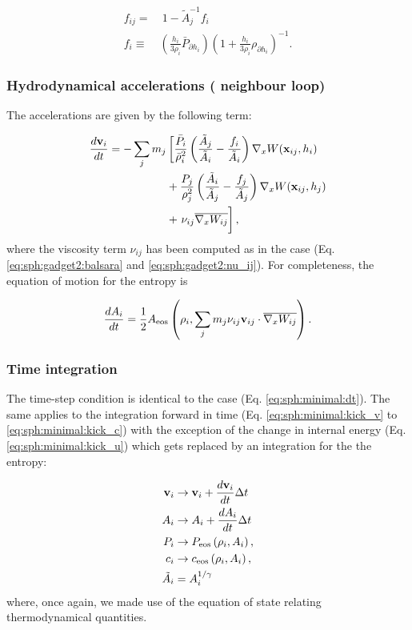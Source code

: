 \begin{align}
    f_{ij} = & ~ 1 - \tilde{A}_j^{-1} f_i \nonumber \\
    f_i \equiv &  \left(\frac{h_i}{3\rho_i}\bar P_{\partial
    h_i}\right)\left(1 + \frac{h_i}{3\rho_i}\rho_{\partial
    h_i}\right)^{-1}. 
\end{align}

\subsubsection{Hydrodynamical accelerations ( neighbour loop)}

The accelerations are given by the following term:

\begin{align}
  \frac{d\vec{v}_i}{dt} = -\sum_j m_j &\left[\frac{\bar P_i}{\bar\rho_i^2} \left(\frac{\tilde A_j}{\tilde A_i} - \frac{f_i}{\tilde A_i}\right)\nabla_x W(\vec{x}_{ij}, h_i) \right.  \nonumber \\
  &+\frac{P_j}{\rho_j^2} \left(\frac{\tilde A_i}{\tilde A_j} - \frac{f_j}{\tilde A_j}\right)\nabla_x W(\vec{x}_{ij},h_j) \\
  &+ \left. \bigg.\nu_{ij} \Wij \right], \label{eq:sph:pe:dv_dt}
\end{align}
where the viscosity term $\nu_{ij}$ has been computed as in
the \GadgetSPH case (Eq. \ref{eq:sph:gadget2:balsara}
and \ref{eq:sph:gadget2:nu_ij}). For completeness, the equation of
motion for the entropy is

\begin{equation}
\frac{dA_i}{dt} = \frac{1}{2} A_{\rm eos}\left(\rho_i, \sum_j
m_j \nu_{ij}\vec{v}_{ij}\cdot \Wij\right).
\end{equation}

\subsubsection{Time integration}

The time-step condition is identical to the \MinimalSPH case
(Eq. \ref{eq:sph:minimal:dt}). The same applies to the integration
forward in time (Eq. \ref{eq:sph:minimal:kick_v} to
\ref{eq:sph:minimal:kick_c}) with the exception of the change in
internal energy (Eq. \ref{eq:sph:minimal:kick_u}) which gets replaced
by an integration for the the entropy:

\begin{align}
  \vec{v}_i &\rightarrow \vec{v}_i + \frac{d\vec{v}_i}{dt} \Delta t  \label{eq:sph:pe:kick_v}\\
  A_i &\rightarrow A_i + \frac{dA_i}{dt} \Delta t \label{eq:sph:pe:kick_A}\\
  P_i &\rightarrow P_{\rm eos}\left(\rho_i, A_i\right) \label{eq:sph:pe:kick_P}, \\
  c_i &\rightarrow c_{\rm eos}\left(\rho_i,
  A_i\right) \label{eq:sph:pe:kick_c}, \\
  \tilde A_i &= A_i^{1/\gamma}
\end{align}
where, once again, we made use of the equation of state relating
thermodynamical quantities.


